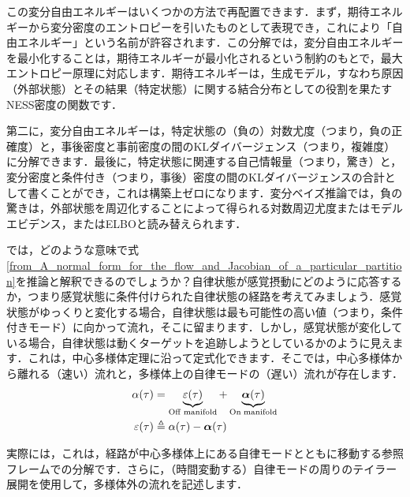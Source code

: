 \documentclass[a4paper, titlepage]{jsarticle}
\begin{document}
この変分自由エネルギーはいくつかの方法で再配置できます．まず，期待エネルギーから変分密度のエントロピーを引いたものとして表現でき，これにより「自由エネルギー」という名前が許容されます．この分解では，変分自由エネルギーを最小化することは，期待エネルギーが最小化されるという制約のもとで，最大エントロピー原理に対応します．期待エネルギーは，生成モデル，すなわち原因（外部状態）とその結果（特定状態）に関する結合分布としての役割を果たすNESS密度の関数です．
\par
第二に，変分自由エネルギーは，特定状態の（負の）対数尤度（つまり，負の正確度）と，事後密度と事前密度の間のKLダイバージェンス（つまり，複雑度）に分解できます．最後に，特定状態に関連する自己情報量（つまり，驚き）と，変分密度と条件付き（つまり，事後）密度の間のKLダイバージェンスの合計として書くことができ，これは構築上ゼロになります．変分ベイズ推論では，負の驚きは，外部状態を周辺化することによって得られる対数周辺尤度またはモデルエビデンス，またはELBOと読み替えられます．
\par
では，どのような意味で式\eqref{from_A_normal_form_for_the_flow_and_Jacobian_of_a_particular_partition}を推論と解釈できるのでしょうか？自律状態が感覚摂動にどのように応答するか，つまり感覚状態に条件付けられた自律状態の経路を考えてみましょう．感覚状態がゆっくりと変化する場合，自律状態は最も可能性の高い値（つまり，条件付きモード）に向かって流れ，そこに留まります．しかし，感覚状態が変化している場合，自律状態は動くターゲットを追跡しようとしているかのように見えます．これは，中心多様体定理に沿って定式化できます．そこでは，中心多様体から離れる（速い）流れと，多様体上の自律モードの（遅い）流れが存在します．
\begin{equation}
    \begin{aligned}
        \alpha\qty(\tau)&=\underbrace{\varepsilon\qty(\tau)}_{\mathrm{Off\;manifold}}+\underbrace{\bm{\alpha}\qty(\tau)}_{\mathrm{On\;manifold}} \\
        \varepsilon\qty(\tau)&\triangleq\alpha\qty(\tau)-\bm{\alpha}\qty(\tau)
    \end{aligned}
\end{equation}
\par
実際には，これは，経路が中心多様体上にある自律モードとともに移動する参照フレームでの分解です．さらに，（時間変動する）自律モードの周りのテイラー展開を使用して，多様体外の流れを記述します．
\end{document}
